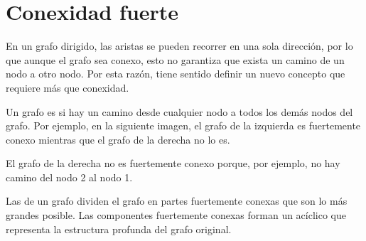 \chapter{Conexidad fuerte}


En un grafo dirigido,
las aristas se pueden recorrer en una sola dirección,
por lo que aunque el grafo sea conexo,
esto no garantiza que exista
un camino de un nodo a otro nodo.
Por esta razón, tiene sentido definir un nuevo concepto
que requiere más que conexidad.

Un grafo es 
si hay un camino desde cualquier nodo a todos
los demás nodos del grafo.
Por ejemplo, en la siguiente imagen,
el grafo de la izquierda es fuertemente conexo
mientras que el grafo de la derecha no lo es.

\begin{center}
\end{center}

El grafo de la derecha no es fuertemente conexo
porque, por ejemplo, no hay camino
del nodo 2 al nodo 1.


Las 
de un grafo dividen el grafo en partes fuertemente conexas
que son lo más grandes posible.
Las componentes fuertemente conexas forman un
 acíclico que representa
la estructura profunda del grafo original.

